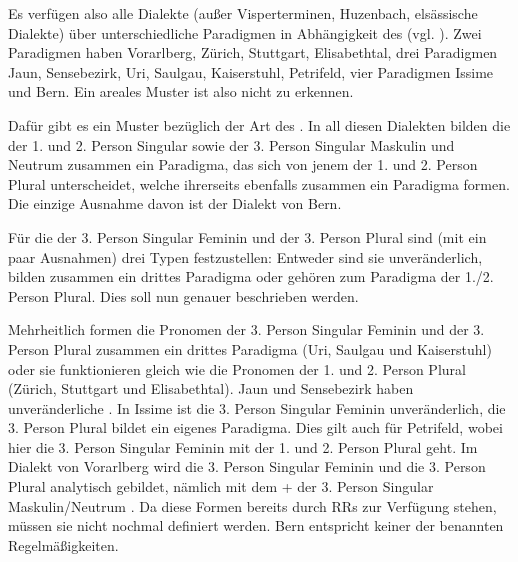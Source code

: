 Es verfügen also alle Dialekte (außer Visperterminen, Huzenbach, elsässische Dialekte) über unterschiedliche Paradigmen in Abhängigkeit des  (vgl. ). Zwei Paradigmen haben Vorarlberg, Zürich, Stuttgart, Elisabethtal, drei Paradigmen Jaun, Sensebezirk, Uri, Saulgau, Kaiserstuhl, Petrifeld, vier Paradigmen Issime und Bern. Ein areales Muster ist also nicht zu erkennen.

Dafür gibt es ein Muster bezüglich der Art des . In all diesen Dialekten bilden die  der 1. und 2. Person Singular sowie der 3. Person Singular Maskulin und Neutrum zusammen ein Paradigma, das sich von jenem der 1. und 2. Person Plural unterscheidet, welche ihrerseits ebenfalls zusammen ein Paradigma formen. Die einzige Ausnahme davon ist der Dialekt von Bern.

Für die  der 3. Person Singular Feminin und der 3. Person Plural sind (mit ein paar Ausnahmen) drei Typen festzustellen: Entweder sind sie unveränderlich, bilden zusammen ein drittes Paradigma oder gehören zum Paradigma der 1./2. Person Plural. Dies soll nun genauer beschrieben werden.

Mehrheitlich formen die Pronomen der 3. Person Singular Feminin und der 3. Person Plural zusammen ein drittes Paradigma (Uri, Saulgau und Kaiserstuhl) oder sie funktionieren gleich wie die Pronomen der 1. und 2. Person Plural (Zürich, Stuttgart und Elisabethtal). Jaun und Sensebezirk haben unveränderliche . In Issime ist die 3. Person Singular Feminin unveränderlich, die 3. Person Plural bildet ein eigenes Paradigma. Dies gilt auch für Petrifeld, wobei hier die 3. Person Singular Feminin mit der 1. und 2. Person Plural geht. Im Dialekt von Vorarlberg wird die 3. Person Singular Feminin und die 3. Person Plural analytisch gebildet, nämlich mit dem  + der 3. Person Singular Maskulin/Neutrum \citep[275]{Jutz1925}. Da diese Formen bereits durch RRs zur Verfügung stehen, müssen sie nicht nochmal definiert werden. Bern entspricht keiner der benannten Regelmäßigkeiten.


